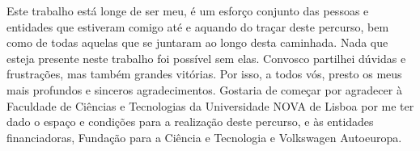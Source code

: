 
%

\begin{ntacknowledgements}

Este trabalho está longe de ser meu, é um esforço conjunto das pessoas e entidades que estiveram comigo até e aquando do traçar deste percurso, bem como de todas aquelas que se juntaram ao longo desta caminhada. Nada que esteja presente neste trabalho foi possível sem elas. Convosco partilhei dúvidas e frustrações, mas também grandes vitórias. Por isso, a todos vós, presto os meus mais profundos e sinceros agradecimentos.
Gostaria de começar por agradecer à Faculdade de Ciências e Tecnologias da Universidade NOVA de Lisboa por me ter dado o espaço e condições para a realização deste percurso, e às entidades financiadoras, Fundação para a Ciência e Tecnologia e Volkswagen Autoeuropa.

\end{ntacknowledgements}
